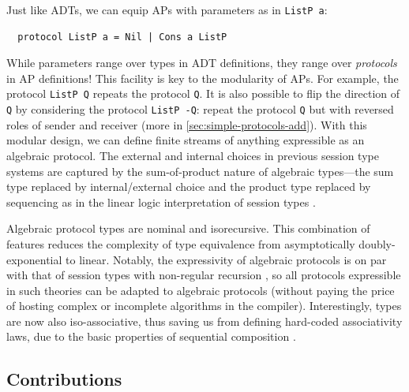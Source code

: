 Just like ADTs, we can equip APs with parameters as in
\lstinline+ListP a+:
\begin{lstlisting}
  protocol ListP a = Nil | Cons a ListP
\end{lstlisting}
While parameters range over types in ADT definitions, they
range over \emph{protocols} in AP definitions! This facility is key to
the modularity of APs. For example, the protocol
\lstinline+ListP Q+ repeats the protocol \lstinline+Q+. It is
also possible to flip the direction of \lstinline+Q+ by considering the protocol
\lstinline+ListP -Q+: repeat the protocol \lstinline+Q+ but with reversed roles
of sender and receiver (more in \cref{sec:simple-protocols-add}). With this
modular design, we can define finite streams of
anything expressible as an algebraic protocol. The
external and internal choices in previous session type systems are
captured by the sum-of-product nature of algebraic types---the sum
type replaced by internal/external choice and the product type
replaced by sequencing as in the linear logic
interpretation of session types \cite{DBLP:journals/mscs/CairesPT16}.

Algebraic protocol types are nominal and isorecursive. 
This combination of features reduces the complexity of type equivalence from
asymptotically doubly-exponential \cite{DBLP:conf/tacas/AlmeidaMV20,DBLP:conf/esop/DasDMP21} 
to linear. Notably, the expressivity of algebraic protocols 
is on par with that of session types with non-regular recursion
\cite{DBLP:conf/icfp/ThiemannV16,DBLP:conf/esop/DasDMP21}, 
so all protocols expressible in such theories can be adapted 
to algebraic protocols (without paying the price of hosting complex or 
incomplete algorithms in the compiler). Interestingly, types 
are now also iso-associative, thus saving us from defining 
hard-coded associativity laws, due to the basic properties 
of sequential composition 
\cite{DBLP:conf/icfp/ThiemannV16,DBLP:journals/corr/abs-2106-06658}.

\subsection*{Contributions}
\label{sec:contributions}


